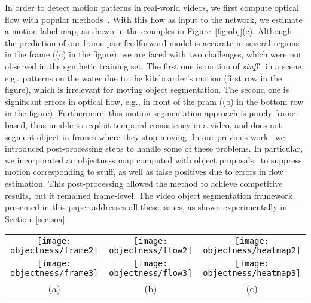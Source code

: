 In order to detect motion patterns in real-world videos, we first compute
optical flow with popular
methods~\cite{sundaram2010dense,Revaud15,ilg2016flownet}. With this
flow as input to the network, we estimate a motion label map, as shown in the
examples in Figure~\ref{fig:obj}(c). Although the prediction of our frame-pair
feedforward model is accurate in several regions in the frame ((c) in the
figure), we are faced with two challenges, which were not observed in the
synthetic training set. The first one is motion of
\textit{stuff}~\cite{Adelson01} in a scene, e.g., patterns on the water due to
the kiteboarder's motion (first row in the figure), which is irrelevant for
moving object segmentation. The second one is significant errors in optical
flow, e.g., in front of the pram ((b) in the bottom row in the figure).
Furthermore, this motion segmentation approach is purely frame-based, thus
unable to exploit temporal consistency in a video, and does not segment object
in frames where they stop moving. In our previous
work~\cite{tokmakov2016learning} we introduced post-processing steps to handle
some of these problems. In particular, we incorporated an objectness map
computed with object proposals~\cite{pinheiro2016learning} to suppress motion
corresponding to stuff, as well as false positives due to errors in flow
estimation. This post-processing allowed the method to achieve competitive
results, but it remained frame-level. The video object segmentation framework
presented in this paper addresses all these issues, as shown experimentally in
Section~\ref{sec:soa}.
\setlength{\tabcolsep}{2pt}
\begin{figure*}[t]
\begin{center}
\begin{tabular}{ccc}
\texttt{[image: objectness/frame2]} & 
\texttt{[image: objectness/flow2]} & 
\texttt{[image: objectness/heatmap2]} \\ 

\texttt{[image: objectness/frame3]} & 
\texttt{[image: objectness/flow3]} & 
\texttt{[image: objectness/heatmap3]}  \\ 
(a) & (b) & (c) 
\end{tabular}
\end{center}
\vspace{-0.3cm}\caption{Sample results on the DAVIS dataset for MP-Net. Each row shows: (a) video frame, (b) optical flow
estimated with LDOF~\cite{Brox11a}, (c) output of our MP-Net with LDOF
flow as input.}\label{fig:obj}
\end{figure*}
\setlength{\tabcolsep}{6pt}

